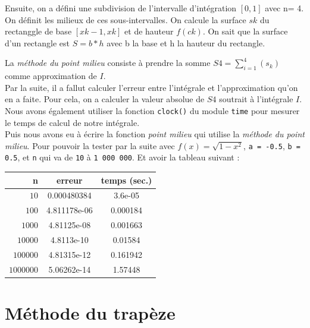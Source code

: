 \documentclass{article}
\begin{document}

Ensuite, on a défini une subdivision de l'intervalle d'intégration $[0,1]$ avec n= 4. 
On définit les milieux de ces sous-intervalles. On calcule la surface $s{k}$ du rectanggle de base $[x{k-1},x{k}]$ et de hauteur $f(c{k})$. On sait que la surface d'un rectangle est $S= b*h$ avec b la base et h la hauteur du rectangle.

La {\it méthode du point milieu} consiste à prendre la somme $S{4}=\sum_{i=1}^{4} (s_{k})$ comme approximation de $I$.
\\

Par la suite, il a fallut calculer l'erreur entre l'intégrale et l'approximation qu'on en a faite. Pour cela, on a calculer la valeur absolue de $S{4}$ soutrait à l'intégrale $I$.
\\

Nous avons également utiliser la fonction \texttt{clock()} du module \texttt{time} pour mesurer le temps de calcul de notre intégrale. 
\\

Puis nous avons eu à écrire la fonction {\it point milieu} qui utilise la {\it méthode du point milieu}. Pour pouvoir la tester par la suite avec $f(x) = \sqrt{1 - x^2}$, \texttt{a = -0.5}, \texttt{b = 0.5}, et \texttt{n} qui va de \texttt{10} à \texttt{1 000 000}. Et avoir la tableau suivant :
\\

\begin{center}
\begin{tabular}{r | c | c}
{n} & erreur & temps (sec.)\\
\hline
$10$ & {0.000480384} & {3.6e-05}\\
$100$ & {4.811178e-06} & {0.000184}\\
$1000$ & {4.81125e-08} & {0.001663}\\
$10000$ & {4.8113e-10} & {0.01584}\\
$100000$ & {4.81315e-12} & {0.161942}\\
$1000000$ & {5.06262e-14} & {1.57448}
\end{tabular}
\end{center}

\section{Méthode du trapèze}
\end{document}

